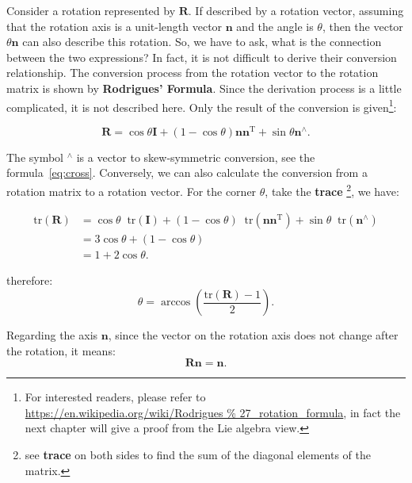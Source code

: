 Consider a rotation represented by $ \mathbf{R} $. If described by a rotation vector, assuming that the rotation axis is a unit-length vector $ \mathbf{n} $ and the angle is $ \theta $, then the vector $ \theta \mathbf{n} $ can also describe this rotation. So, we have to ask, what is the connection between the two expressions? In fact, it is not difficult to derive their conversion relationship. The conversion process from the rotation vector to the rotation matrix is shown by \textbf{Rodrigues' Formula}. Since the derivation process is a little complicated, it is not described here. Only the result of the conversion is given\footnote{For interested readers, please refer to \url{https://en.wikipedia.org/wiki/Rodrigues \% 27_rotation_formula}, in fact the next chapter will give a proof from the Lie algebra view.}:

\begin{equation}
\label{eq:rogridues}
\mathbf{R} = \cos \theta \mathbf{I} + \left({ 1 - \cos \theta } \right) \mathbf{n} { \mathbf {n} ^ \mathrm{T} } + \sin \theta { \mathbf{n}^ \wedge }.
\end{equation}

The symbol $ ^ \wedge $ is a vector to skew-symmetric conversion, see the formula~\eqref{eq:cross}. Conversely, we can also calculate the conversion from a rotation matrix to a rotation vector. For the corner $ \theta $, take the \textbf{trace} \footnote {see \textbf{trace} on both sides to find the sum of the diagonal elements of the matrix. }, we have:

\begin{equation}
\begin{aligned}
\mathrm{tr} \left( \mathbf{R} \right) &= \cos \theta \mathop{}\!\mathrm{tr}\left( \mathbf{I} \right) + \left( {1 - \cos \theta } \right) \mathop{}\!\mathrm{tr} \left( { \mathbf{n} {\mathbf{n}^\mathrm{T}}} \right) + \sin \theta \mathop{}\!\mathrm{tr} ({\mathbf{n}^ \wedge })\\
&= 3\cos \theta  + (1 - \cos \theta )\\
&= 1 + 2\cos \theta .
\end{aligned} 
\end{equation}

therefore:
\begin{equation}
\label{eq:R2theta}
\theta = \arccos ( \frac{\mathrm{tr}(\mathbf{R}) - 1}{2}  ) .
\end{equation}

Regarding the axis $ \mathbf{n} $, since the vector on the rotation axis does not change after the rotation, it means:
\begin{equation}
\mathbf{R} \mathbf{n} = \mathbf{n}.
\end{equation}

